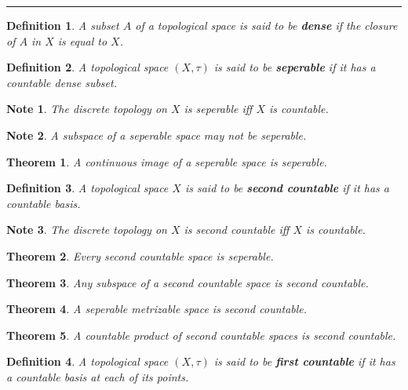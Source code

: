 \documentclass[14pt,twoside]{extreport}
\newcommand{\hhrule}{\vspace{1cm}\hrule\vspace{1cm}}
\theoremstyle{dotless}
\newtheorem*{defn}{Definition}
\newtheorem*{thm}{Theorem} %
\newtheorem*{note}{Note} %
\begin{document}
\hhrule



\begin{defn}
    A subset $A$ of a topological space is said to be \textbf{dense} if the closure of $A$ in $X$ is equal to $X$.
\end{defn}

\begin{defn}
    A topological space $(X, \tau)$ is said to be \textbf{seperable} if it has a countable dense subset.
\end{defn}

\begin{note}
    The discrete topology on $X$ is seperable iff $X$ is countable.
\end{note}

\begin{note}
    A subspace of a seperable space may not be seperable.
\end{note}

\begin{thm}
    A continuous image of a seperable space is seperable.
\end{thm}

\begin{defn}
    A topological space $X$ is said to be \textbf{second countable} if it has a countable basis.
\end{defn}

\begin{note}
    The discrete topology on $X$ is second countable iff $X$ is countable.
\end{note}

\begin{thm}
    Every second countable space is seperable.
\end{thm}

\begin{thm}
    Any subspace of a second countable space is second countable.
\end{thm}

\begin{thm}
    A seperable metrizable space is second countable.
\end{thm}

\begin{thm}
    A countable product of second countable spaces is second countable.
\end{thm}

\begin{defn}
    A topological space $(X, \tau)$ is said to be \textbf{first countable} if it has a countable basis at each of its points.
\end{defn}
\end{document}
